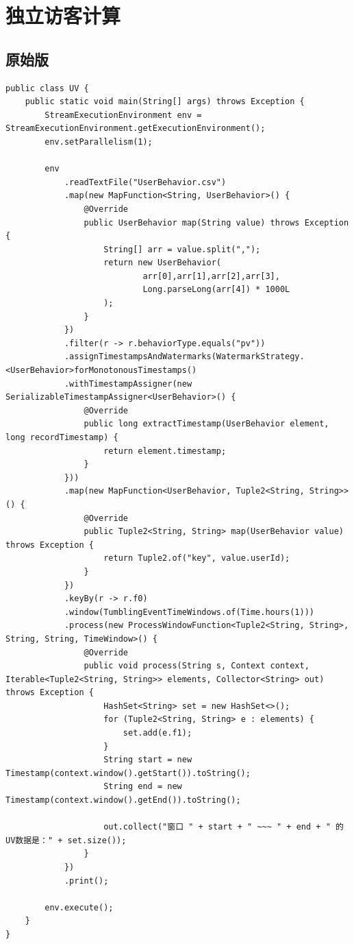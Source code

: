 \documentclass[cn,11pt,chinese]{elegantbook}
\begin{document}
\section{独立访客计算}

\subsection{原始版}

\begin{verbatim}
public class UV {
    public static void main(String[] args) throws Exception {
        StreamExecutionEnvironment env = StreamExecutionEnvironment.getExecutionEnvironment();
        env.setParallelism(1);

        env
            .readTextFile("UserBehavior.csv")
            .map(new MapFunction<String, UserBehavior>() {
                @Override
                public UserBehavior map(String value) throws Exception {
                    String[] arr = value.split(",");
                    return new UserBehavior(
                            arr[0],arr[1],arr[2],arr[3],
                            Long.parseLong(arr[4]) * 1000L
                    );
                }
            })
            .filter(r -> r.behaviorType.equals("pv"))
            .assignTimestampsAndWatermarks(WatermarkStrategy.<UserBehavior>forMonotonousTimestamps()
            .withTimestampAssigner(new SerializableTimestampAssigner<UserBehavior>() {
                @Override
                public long extractTimestamp(UserBehavior element, long recordTimestamp) {
                    return element.timestamp;
                }
            }))
            .map(new MapFunction<UserBehavior, Tuple2<String, String>>() {
                @Override
                public Tuple2<String, String> map(UserBehavior value) throws Exception {
                    return Tuple2.of("key", value.userId);
                }
            })
            .keyBy(r -> r.f0)
            .window(TumblingEventTimeWindows.of(Time.hours(1)))
            .process(new ProcessWindowFunction<Tuple2<String, String>, String, String, TimeWindow>() {
                @Override
                public void process(String s, Context context, Iterable<Tuple2<String, String>> elements, Collector<String> out) throws Exception {
                    HashSet<String> set = new HashSet<>();
                    for (Tuple2<String, String> e : elements) {
                        set.add(e.f1);
                    }
                    String start = new Timestamp(context.window().getStart()).toString();
                    String end = new Timestamp(context.window().getEnd()).toString();

                    out.collect("窗口 " + start + " ~~~ " + end + " 的UV数据是：" + set.size());
                }
            })
            .print();

        env.execute();
    }
}
\end{verbatim}
\end{document}
